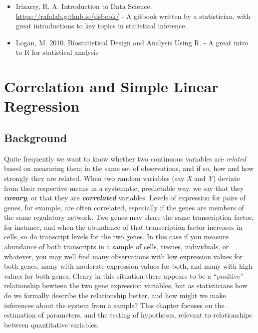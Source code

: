 \documentclass[]{book}
\begin{document}
\begin{itemize}
\item
  Irizarry, R. A. Introduction to Data Science. \url{https://rafalab.github.io/dsbook/} - A gitbook written by a statistician, with great introductions to key topics in statistical inference.
\item
  Logan, M. 2010. Biostatistical Design and Analysis Using R. - A great intro to R for statistical analysis
\end{itemize}

\hypertarget{correlation-and-simple-linear-regression}{%
\chapter{Correlation and Simple Linear Regression}\label{correlation-and-simple-linear-regression}}

\hypertarget{background-6}{%
\section{Background}\label{background-6}}

Quite frequently we want to know whether two continuous variables are \emph{related} based on measuring them in the same set of observations, and if so, how and how strongly they are related. When two random variables (say \emph{X} and \emph{Y}) deviate from their respective means in a systematic, predictable way, we say that they \textbf{\emph{covary}}, or that they are \textbf{\emph{correlated}} variables. Levels of expression for pairs of genes, for example, are often correlated, especially if the genes are members of the same regulatory network. Two genes may share the same transcription factor, for instance, and when the abundance of that transcription factor increases in cells, so do transcript levels for the two genes. In this case if you measure abundance of both transcripts in a sample of cells, tissues, individuals, or whatever, you may well find many observations with low expression values for both genes, many with moderate expression values for both, and many with high values for both genes. Cleary in this situation there appears to be a ``positive'' relationship bewteen the two gene expression variables, but as statisticians how do we formally describe the relationship better, and how might we make inferences about the system from a sample? This chapter focuses on the estimation of parameters, and the testing of hypotheses, relevant to relationships between quantitative variables.
\end{document}
